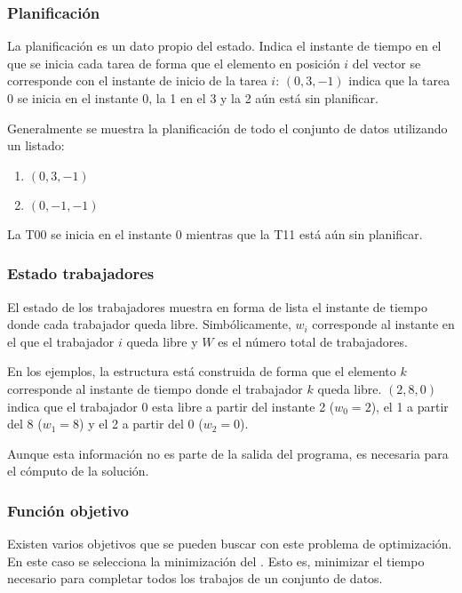 \subsubsection{Planificación}

La planificación es un dato propio del estado.
Indica el instante de tiempo en el que se inicia cada tarea
de forma que el elemento en posición $i$ del vector se
corresponde con el instante de inicio de la tarea $i$:
$(0, 3, -1)$ indica que la tarea 0 se inicia en el instante 0,
la 1 en el 3 y la 2 aún está sin planificar.

Generalmente se muestra la planificación de todo el conjunto de datos
utilizando un listado:
\begin{enumerate}[start=0, itemsep=0.25px]
    \item $(0, 3, -1)$
    \item $(0, -1, -1)$
\end{enumerate}
La T00 se inicia en el instante 0 mientras que la T11 está aún sin planificar.

\subsubsection{Estado trabajadores}

El estado de los trabajadores muestra en forma de lista
el instante de tiempo donde cada trabajador queda libre.
Simbólicamente, $w_i$ corresponde al instante
en el que el trabajador $i$ queda libre y
$W$ es el número total de trabajadores.

En los ejemplos, la estructura está construida de forma que el elemento $k$
corresponde al instante de tiempo donde el trabajador $k$
queda libre.
$(2, 8, 0)$ indica que el trabajador 0 esta libre a partir del instante 2
($w_0 = 2$),
el 1 a partir del 8
($w_1 = 8$)
y el 2 a partir del 0
($w_2 = 0$).

Aunque esta información no es parte de la salida del programa,
es necesaria para el cómputo de la solución.

\subsubsection{Función objetivo}

Existen varios objetivos que se pueden buscar con este problema
de optimización.
En este caso se selecciona la minimización del .
Esto es, minimizar el tiempo necesario para completar
todos los trabajos de un conjunto de datos.

